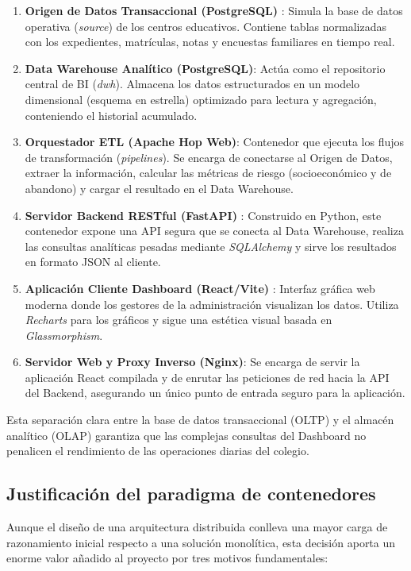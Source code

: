 \begin{enumerate}
    \item \textbf{Origen de Datos Transaccional (PostgreSQL)} \cite{PostgreSQL_Docs}: Simula la base de datos operativa (\textit{source}) de los centros educativos. Contiene tablas normalizadas con los expedientes, matrículas, notas y encuestas familiares en tiempo real.
    \item \textbf{Data Warehouse Analítico (PostgreSQL)}: Actúa como el repositorio central de BI (\textit{dwh}). Almacena los datos estructurados en un modelo dimensional (esquema en estrella) optimizado para lectura y agregación, conteniendo el historial acumulado.
    \item \textbf{Orquestador ETL (Apache Hop Web)}: Contenedor que ejecuta los flujos de transformación (\textit{pipelines}). Se encarga de conectarse al Origen de Datos, extraer la información, calcular las métricas de riesgo (socioeconómico y de abandono) y cargar el resultado en el Data Warehouse.
    \item \textbf{Servidor Backend RESTful (FastAPI)} \cite{FastAPI_Docs}: Construido en Python, este contenedor expone una API segura que se conecta al Data Warehouse, realiza las consultas analíticas pesadas mediante \textit{SQLAlchemy} y sirve los resultados en formato JSON al cliente.
    \item \textbf{Aplicación Cliente Dashboard (React/Vite)} \cite{React_Docs}: Interfaz gráfica web moderna donde los gestores de la administración visualizan los datos. Utiliza \textit{Recharts} para los gráficos y sigue una estética visual basada en \textit{Glassmorphism}.
    \item \textbf{Servidor Web y Proxy Inverso (Nginx)}: Se encarga de servir la aplicación React compilada y de enrutar las peticiones de red hacia la API del Backend, asegurando un único punto de entrada seguro para la aplicación.
\end{enumerate}

Esta separación clara entre la base de datos transaccional (OLTP) y el almacén analítico (OLAP) garantiza que las complejas consultas del Dashboard no penalicen el rendimiento de las operaciones diarias del colegio.

\subsection{Justificación del paradigma de contenedores}

Aunque el diseño de una arquitectura distribuida conlleva una mayor carga de razonamiento inicial respecto a una solución monolítica, esta decisión aporta un enorme valor añadido al proyecto por tres motivos fundamentales:

